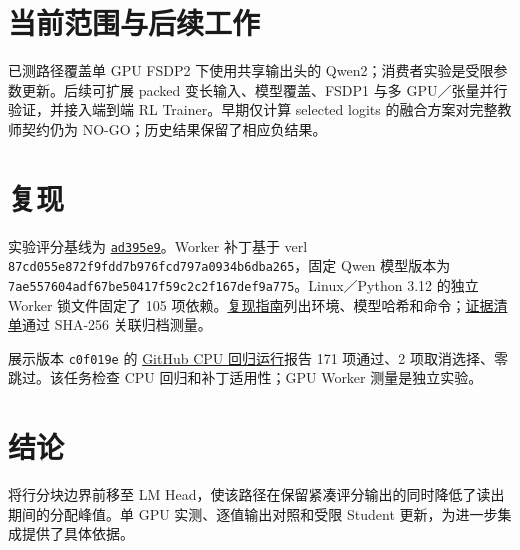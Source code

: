 \documentclass[11pt,a4paper]{article}
\newcommand{\code}[1]{{\small\nolinkurl{#1}}}
\begin{document}
\section{当前范围与后续工作}
已测路径覆盖单 GPU FSDP2 下使用共享输出头的 Qwen2；消费者实验是受限参数更新。后续可扩展 packed 变长输入、模型覆盖、FSDP1 与多 GPU／张量并行验证，并接入端到端 RL Trainer。早期仅计算 selected logits 的融合方案对完整教师契约仍为 NO-GO；历史结果保留了相应负结果。

\section{复现}
实验评分基线为 \href{https://github.com/yu830/rl-posttrain-sparse-scoring/commit/ad395e94923bcf65fff4bc1eeb2e0e1505fd4f91}{\code{ad395e9}}。Worker 补丁基于 verl \code{87cd055e872f9fdd7b976fcd797a0934b6dba265}，固定 Qwen 模型版本为 \code{7ae557604adf67be50417f59c2c2f167def9a775}。Linux／Python 3.12 的独立 Worker 锁文件固定了 105 项依赖。\href{https://github.com/yu830/rl-posttrain-sparse-scoring/blob/main/docs/experimental-reproduction.md}{复现指南}列出环境、模型哈希和命令；\href{https://github.com/yu830/rl-posttrain-sparse-scoring/blob/main/results/worker-evidence-manifest.json}{证据清单}通过 SHA-256 关联归档测量。

展示版本 \code{c0f019e} 的 \href{https://github.com/yu830/rl-posttrain-sparse-scoring/actions/runs/41170230693}{GitHub CPU 回归运行}报告 171 项通过、2 项取消选择、零跳过。该任务检查 CPU 回归和补丁适用性；GPU Worker 测量是独立实验。

\section{结论}
将行分块边界前移至 LM Head，使该路径在保留紧凑评分输出的同时降低了读出期间的分配峰值。单 GPU 实测、逐值输出对照和受限 Student 更新，为进一步集成提供了具体依据。

\begingroup\small\setlength{\bibsep}{0pt}


\endgroup
\end{document}
